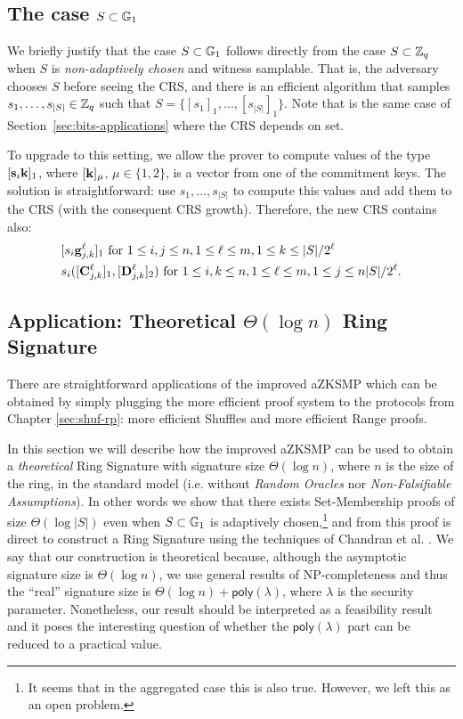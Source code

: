 \subsection{The case $S\subset\mathbb{G}_1$} \label{sec:improved-aZKSMP-group-case}
We briefly justify that the case $S\subset\mathbb{G}_1$ follows directly from the case $S\subset\mathbb{Z}_q$ when $S$ is \emph{non-adaptively chosen} and witness samplable. That is, the adversary chooses $S$ before seeing the CRS, and there is an efficient algorithm that samples $s_1,\ldots,s_{|S|}\in\mathbb{Z}_q$ such that $S=\{[s_1]_1,\ldots,[s_{|S|}]_1\}$. Note that is the same case of Section~\ref{sec:bits-applications} where the CRS depends on set.

To upgrade to this setting, we allow the prover to compute values of the type $[\mathbf{s}_i\mathbf{k}]_1$, where $[\mathbf{k}]_\mu$, $\mu\in\{1,2\}$, is a vector from one of the commitment keys. The solution is straightforward: use $s_1,\ldots,s_{|S|}$ to compute this values and add them to the CRS (with the consequent CRS growth). Therefore, the new CRS contains also:
\begin{align*}
&[s_i\mathbf{g}_{j,k}^\ell]_1 \text{ for }1\leq i,j\leq n, 1\leq\ell\leq m, 1\leq k\leq |S|/2^\ell\\
& s_i([\mathbf{{C}}^\ell_{j,k}]_1,[\mathbf{{D}}_{j,k}^\ell]_2) \text{ for } 1\leq i,k\leq n, 1\leq\ell\leq m,1\leq j\leq n|S|/2^\ell.
\end{align*}

\subsection{Application: Theoretical $\Theta(\log n)$ Ring Signature} \label{sec:log-ring-signature}
There are straightforward applications of the improved aZKSMP which can be obtained by simply plugging the more efficient proof system to the protocols from Chapter \ref{sec:shuf-rp}: more efficient Shuffles and more efficient Range proofs.

In this section we will describe how the improved aZKSMP can be used to obtain a \emph{theoretical} Ring Signature with signature size $\Theta(\log n)$, where $n$ is the size of the ring, in the standard model (i.e. without \emph{Random Oracles} nor \emph{Non-Falsifiable Assumptions}). In other words we show that there exists Set-Membership proofs of size $\Theta(\log |S|)$ even when $S\subset \mathbb{G}_1$ is adaptively chosen,\footnote{It seems that in the aggregated case this is also true. However, we left this as an open problem.} and from this proof is direct to construct a Ring Signature using the techniques of Chandran et al. \cite{ICALP:ChaGroSah07}. We say that our construction is theoretical because, although the asymptotic signature size is $\Theta(\log n)$, we use general results of NP-completeness and thus the ``real'' signature size is $\Theta(\log n)+\mathsf{poly}(\lambda)$, where $\lambda$ is the security parameter. Nonetheless, our result should be interpreted as a feasibility result and it poses the interesting question of whether the $\mathsf{poly}(\lambda)$ part can be reduced to a practical value.

